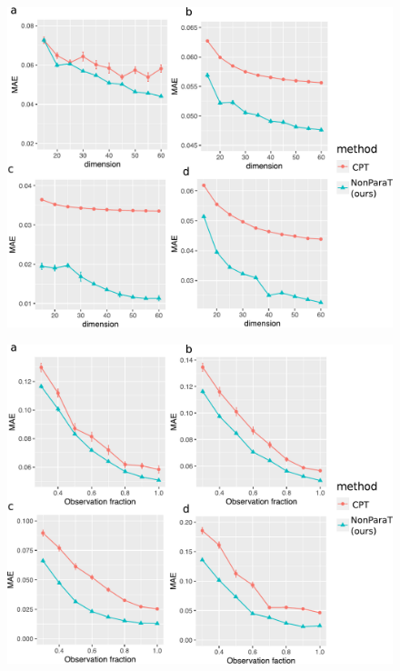 \documentclass{article}
\theoremstyle{plain}
\theoremstyle{definition}
\def\srank{\textup{srank}}
\def\rank{\textup{rank}}
\begin{document}

\begin{figure}[H]
\includegraphics[width=.5\textwidth]{fig1-4.pdf}
\end{figure}

\begin{figure}[H]
\includegraphics[width=.5\textwidth]{fig5-8.pdf}
\end{figure}
\end{document}
